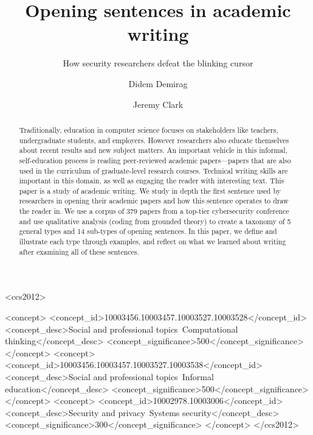 \documentclass[sigconf]{acmart}
\begin{document}
\title{Opening sentences in academic writing}
\subtitle{How security researchers defeat the blinking cursor}

\author{Didem Demirag}
\author{Jeremy Clark}

\begin{abstract}

Traditionally, education in computer science focuses on stakeholders like teachers, undergraduate students, and employers. However researchers also educate themselves about recent results and new subject matters. An important vehicle in this informal, self-education process is reading peer-reviewed academic papers---papers that are also used in the curriculum of graduate-level research courses. Technical writing skills are important in this domain, as well as engaging the reader with interesting text. This paper is a study of academic writing. We study in depth the first sentence used by researchers in opening their academic papers and how this sentence operates to draw the reader in. We use a corpus of 379 papers from a top-tier cybersecurity conference and use qualitative analysis (coding from grounded theory) to create a taxonomy of 5 general types and 14 sub-types of opening sentences. In this paper, we define and illustrate each type through examples, and reflect on what we learned about writing after examining all of these sentences.

\end{abstract}

\begin{CCSXML}
<ccs2012>

   <concept>
       <concept_id>10003456.10003457.10003527.10003528</concept_id>
       <concept_desc>Social and professional topics~Computational thinking</concept_desc>
       <concept_significance>500</concept_significance>
       </concept>
       <concept>
<concept_id>10003456.10003457.10003527.10003538</concept_id>
<concept_desc>Social and professional topics~Informal education</concept_desc>
<concept_significance>500</concept_significance>
</concept>
   <concept>
       <concept_id>10002978.10003006</concept_id>
       <concept_desc>Security and privacy~Systems security</concept_desc>
       <concept_significance>300</concept_significance>
       </concept>
 </ccs2012>
\end{CCSXML}
\end{document}
